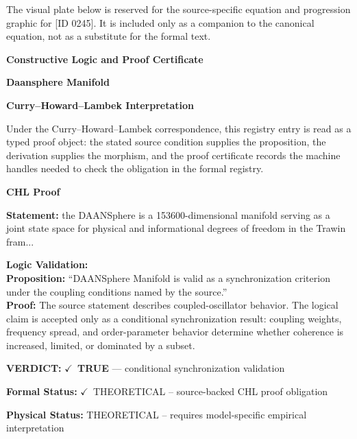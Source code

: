 \begingroup\footnotesize\sloppy
The visual plate below is reserved for the source-specific equation and progression graphic for [ID 0245]. It is included only as a companion to the canonical equation, not as a substitute for the formal text.
\par\endgroup
\ifTZPDarkEdition
{}
\fi

\clearpage
\begingroup\tzpsupportsetup
\noindent\textbf{\fontsize{10.8pt}{12.8pt}\selectfont [ID 0245] Constructive Logic and Proof Certificate}\par
\noindent\textbf{\fontsize{10pt}{12pt}\selectfont Daansphere Manifold}\par
\vspace{0.45em}
\begingroup
\footnotesize
\setlength{\parskip}{0.22em}
\setlength{\parindent}{0pt}
\noindent\textbf{Curry--Howard--Lambek Interpretation}\par
Under the Curry--Howard--Lambek correspondence, this registry entry is read as a typed proof
object: the stated source condition supplies the proposition, the derivation supplies the
morphism, and the proof certificate records the machine handles needed to check the obligation
in the formal registry.

\vspace{0.45em}
\noindent\textbf{CHL Proof}\par
\textbf{Statement:} the DAANSphere is a 153600-dimensional manifold serving as a joint state space for
physical and informational degrees of freedom in the Trawin fram...

\textbf{Logic Validation:}\\
\textbf{Proposition:} ``DAANSphere Manifold is valid as a synchronization criterion under the coupling
conditions named by the source.''\\
\textbf{Proof:} The source statement describes coupled-oscillator behavior. The logical claim is
accepted only as a conditional synchronization result: coupling weights, frequency
spread, and order-parameter behavior determine whether coherence is increased, limited,
or dominated by a subset.

\textbf{VERDICT:} \ensuremath{\checkmark}\ \textbf{TRUE} --- conditional synchronization validation

\textbf{Formal Status:} \ensuremath{\checkmark}\ THEORETICAL -- source-backed CHL proof obligation

\textbf{Physical Status:} THEORETICAL -- requires model-specific empirical interpretation
\par\vspace{0.45em}
\par
\ifTZPDarkEdition
{}
\fi
\endgroup
\endgroup
